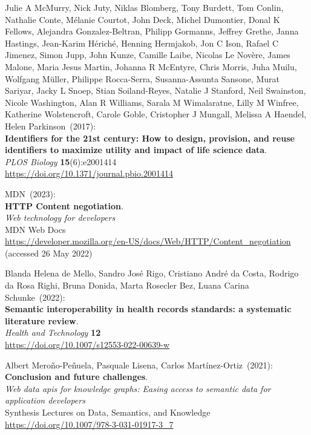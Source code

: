 \begin{thebibliography}{9}
Julie A McMurry, Nick Juty, Niklas Blomberg, Tony Burdett, Tom Conlin, Nathalie Conte, Mélanie Courtot, John Deck, Michel Dumontier, Donal K Fellows, Alejandra Gonzalez-Beltran, Philipp Gormanns, Jeffrey Grethe, Janna Hastings, Jean-Karim Hériché, Henning Hermjakob, Jon C Ison, Rafael C Jimenez, Simon Jupp, John Kunze, Camille Laibe, Nicolas Le Novère, James Malone, Maria Jesus Martin, Johanna R McEntyre, Chris Morris, Juha Muilu, Wolfgang Müller, Philippe Rocca-Serra, Susanna-Assunta Sansone, Murat Sariyar, Jacky L Snoep, Stian Soiland-Reyes, Natalie J Stanford, Neil Swainston, Nicole Washington, Alan R Williams, Sarala M Wimalaratne, Lilly M Winfree, Katherine Wolstencroft, Carole Goble, Cristopher J Mungall, Melissa A Haendel, Helen Parkinson~(2017): \\
\textbf{Identifiers for the 21st century: How to design, provision, and reuse identifiers to maximize utility and impact of life science data}.\\
\emph{PLOS Biology} \textbf{15}(6):e2001414\\
\url{https://doi.org/10.1371/journal.pbio.2001414}

MDN~(2023): \\
\textbf{HTTP Content negotiation}.\\
\emph{Web technology for developers}\\
MDN Web Docs \\
\url{https://developer.mozilla.org/en-US/docs/Web/HTTP/Content_negotiation}
(accessed 26 May 2022)

Blanda Helena de Mello, Sandro José Rigo, Cristiano André da Costa, Rodrigo da Rosa Righi, Bruna Donida, Marta Rosecler Bez, Luana Carina Schunke~(2022): \\
\textbf{Semantic interoperability in health records standards: a systematic literature review}.\\
\emph{Health and Technology} \textbf{12}\\
\url{https://doi.org/10.1007/s12553-022-00639-w}

Albert Meroño-Peñuela, Pasquale Lisena, Carlos Martínez-Ortiz~(2021): \\
\textbf{Conclusion and future challenges}. \\
\emph{Web data apis for knowledge graphs: {Easing} access to semantic data for application
developers} \\
Synthesis Lectures on Data, Semantics, and Knowledge\\
\url{https://doi.org/10.1007/978-3-031-01917-3_7}


\end{thebibliography}
